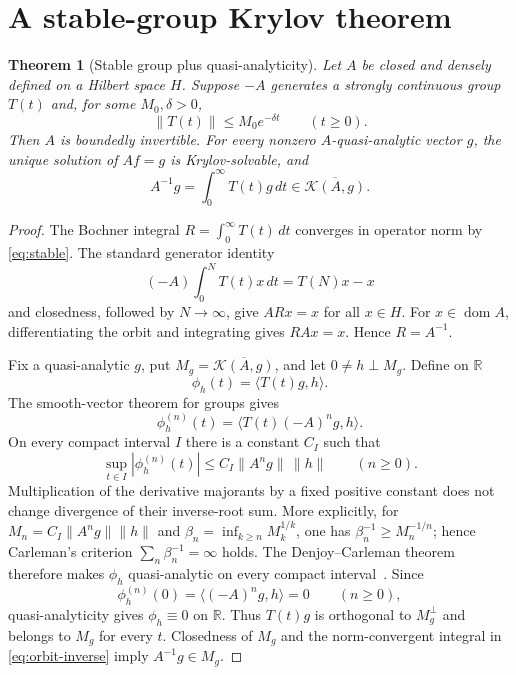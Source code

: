 \documentclass[11pt]{article}
\newtheorem{theorem}{Theorem}
\newcommand{\R}{\mathbb{R}}
\newcommand{\K}{\mathcal{K}}
\begin{document}
\section*{A stable-group Krylov theorem}

\begin{theorem}[Stable group plus quasi-analyticity]\label{thm:group}
Let $A$ be closed and densely defined on a Hilbert space $H$.  Suppose $-A$
generates a strongly continuous group $T(t)$ and, for some $M_0,\delta>0$,
\begin{equation}\label{eq:stable}
 \|T(t)\|\leq M_0e^{-\delta t}\qquad(t\geq0).
\end{equation}
Then $A$ is boundedly invertible.  For every nonzero $A$-quasi-analytic vector
$g$, the unique solution of $Af=g$ is Krylov-solvable, and
\begin{equation}\label{eq:orbit-inverse}
 A^{-1}g=\int_0^\infty T(t)g\,dt
 \in\overline{\K(A,g)}.
\end{equation}
\end{theorem}

\begin{proof}
The Bochner integral $R=\int_0^\infty T(t)\,dt$ converges in operator norm by
\eqref{eq:stable}.  The standard generator identity
\[
 (-A)\int_0^N T(t)x\,dt=T(N)x-x
\]
and closedness, followed by $N\to\infty$, give $ARx=x$ for all $x\in H$.
For $x\in\operatorname{dom}A$, differentiating the orbit and integrating gives
$RAx=x$.  Hence $R=A^{-1}$.

Fix a quasi-analytic $g$, put
$M_g=\overline{\K(A,g)}$, and let $0\ne h\perp M_g$.  Define on $\R$
\[
 \phi_h(t)=\langle T(t)g,h\rangle.
\]
The smooth-vector theorem for groups gives
\[
 \phi_h^{(n)}(t)=\langle T(t)(-A)^ng,h\rangle.
\]
On every compact interval $I$ there is a constant $C_I$ such that
\begin{equation}\label{eq:derivative-bound}
 \sup_{t\in I}|\phi_h^{(n)}(t)|
 \leq C_I\|A^ng\|\,\|h\|\qquad(n\geq0).
\end{equation}
Multiplication of the derivative majorants by a fixed positive constant does
not change divergence of their inverse-root sum.  More explicitly, for
$M_n=C_I\|A^ng\|\|h\|$ and
$\beta_n=\inf_{k\geq n}M_k^{1/k}$, one has
$\beta_n^{-1}\geq M_n^{-1/n}$; hence Carleman's criterion
$\sum_n\beta_n^{-1}=\infty$ holds.  The Denjoy--Carleman theorem therefore
makes $\phi_h$ quasi-analytic on every compact interval~\cite{Chernoff}.  Since
\[
 \phi_h^{(n)}(0)=\langle(-A)^ng,h\rangle=0\qquad(n\geq0),
\]
quasi-analyticity gives $\phi_h\equiv0$ on $\R$.  Thus $T(t)g$ is orthogonal
to $M_g^\perp$ and belongs to $M_g$ for every $t$.  Closedness of $M_g$ and
the norm-convergent integral in \eqref{eq:orbit-inverse} imply
$A^{-1}g\in M_g$.
\end{proof}
\end{document}
